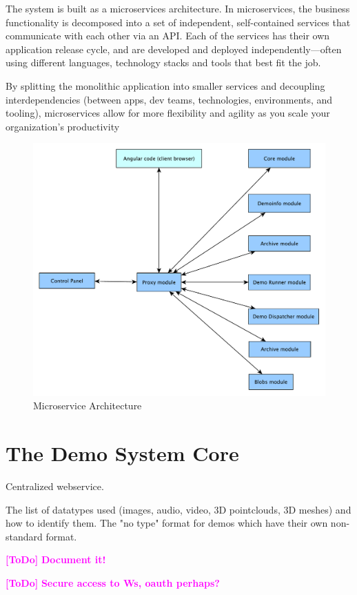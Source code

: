 \documentclass[a4paper,12pt]{article}
\newcommand{\ToDo}[1]{\textcolor{magenta}{\textbf{[ToDo]} \textbf{#1}}}
\begin{document}
The system is built as a microservices architecture.
In microservices, the business functionality is decomposed into a set of independent, self-contained services that communicate with each other via an API. Each of the services has their own application release cycle, and are developed and deployed independently—often using different languages, technology stacks and tools that best fit the job.

By splitting the monolithic application into smaller services and decoupling interdependencies (between apps, dev teams, technologies, environments, and tooling), microservices allow for more flexibility and agility as you scale your organization’s productivity

\begin{figure}[!ht]
\centering
\includegraphics[width=0.5\columnwidth]{proxy/images/microservice_architecture_system.pdf}
\caption{Microservice Architecture} 
\label{fi:proxy_example}
\end{figure}

\section{The Demo System Core}
Centralized webservice.

The list of datatypes used (images, audio, video, 3D pointclouds, 3D meshes) and how to identify them. The "no type" format for demos which have their own non-standard format.

\ToDo{Document it!}










\ToDo{Secure access to Ws, oauth perhaps?}
\end{document}

